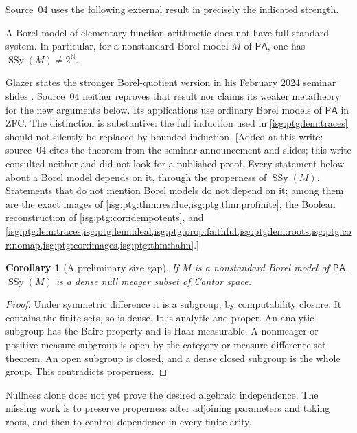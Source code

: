 \documentclass[11pt]{article}
\newtheorem{corollary}[corollary]{Corollary}
\theoremstyle{definition}
\theoremstyle{remark}
\newcommand{\N}{\mathbb{N}}
\newcommand{\PA}{\mathsf{PA}}
\newcommand{\SSy}{\operatorname{SSy}}
\begin{document}
Source~04 uses the following external result in precisely the indicated
strength.

\begin{fact}\label{isg:ptg:fact:glazer}
A Borel model of elementary function arithmetic does not have full
standard system. In particular, for a nonstandard Borel model $M$ of
$\PA$, one has $\SSy(M)\ne2^\N$.
\end{fact}

Glazer states the stronger Borel-quotient version in his February 2024
seminar slides \cite[slide~4]{GlazerSS}. Source~04 neither reproves that
result nor claims its weaker metatheory for the new arguments below. Its
applications use ordinary Borel models of $\PA$ in ZFC. The distinction is
substantive: the full induction used in \cref{isg:ptg:lem:traces} should
not silently be replaced by bounded induction.
\textup{[}Added at this write: source~04 cites the theorem from the
seminar announcement and slides; this write consulted neither and did not
look for a published proof. Every statement below about a Borel model
depends on it, through the properness of $\SSy(M)$. Statements that do not
mention Borel models do not depend on it; among them are the exact images
of \cref{isg:ptg:thm:residue,isg:ptg:thm:profinite}, the Boolean
reconstruction of \cref{isg:ptg:cor:idempotents}, and
\cref{isg:ptg:lem:traces,isg:ptg:lem:ideal,isg:ptg:prop:faithful,isg:ptg:lem:roots,isg:ptg:cor:nomap,isg:ptg:cor:images,isg:ptg:thm:hahn}.\textup{]}

\begin{corollary}[A preliminary size gap]\label{isg:ptg:cor:sssmall}
If $M$ is a nonstandard Borel model of $\PA$, $\SSy(M)$ is a dense null
meager subset of Cantor space.
\end{corollary}
\begin{proof}
Under symmetric difference it is a subgroup, by computability closure. It
contains the finite sets, so is dense. It is analytic and proper. An
analytic subgroup has the Baire property and is Haar measurable. A
nonmeager or positive-measure subgroup is open by the category or measure
difference-set theorem. An open subgroup is closed, and a dense closed
subgroup is the whole group. This contradicts properness.
\end{proof}

Nullness alone does not yet prove the desired algebraic independence. The
missing work is to preserve properness after adjoining parameters and
taking roots, and then to control dependence in every finite arity.
\end{document}
